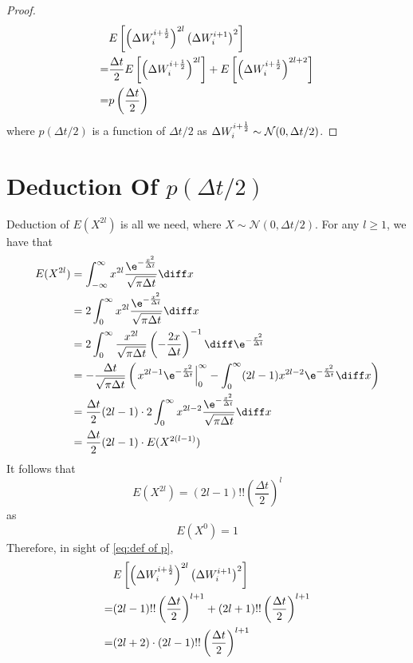 \begin{proof}
        \begin{equation}
            \label{eq:def of p}
            \begin{aligned}
            &E\left[
            \left(\Delta W_{i}^{i+\frac{1}{2}}\right)^{2l}
            \left(\Delta W_{i}^{i+1}\right)^2
            \right]\\
            =&\frac{\Delta t}{2}E\left[\left(\Delta W_{i}^{i+\frac{1}{2}}\right)^{2l}\right]
            +E\left[\left(\Delta W_{i}^{i+\frac{1}{2}}\right)^{2l+2}\right]\\
            =&p\left(\frac{\Delta t}{2}\right)
            \end{aligned}
        \end{equation}
        where $p(\Delta t/2)$ is a function of $\Delta t/2$
        as $\Delta W_{i}^{i+\frac{1}{2}}\sim\mathcal N(0,\Delta t/2)$.
    \end{proof}

    \section[Deduction Of p(Delta t/2)]{Deduction Of $p(\Delta t/2)$}
    \label{sec:deduction of p}
    Deduction of $E(X^{2l})$ is all we need, where $X\sim\mathcal N(0,\Delta t/2)$.
    For any $l\geq 1$, we have that
    \[\begin{aligned}
        E(X^{2l})&=\int_{-\infty}^\infty
        x^{2l}\frac{\e^{-\frac{x^2}{\Delta t}}}{\sqrt{\pi\Delta t}}
        \diff x\\
        &=2\int_{0}^\infty
        x^{2l}\frac{\e^{-\frac{x^2}{\Delta t}}}{\sqrt{\pi\Delta t}}
        \diff x\\
        &=2\int_{0}^\infty
        \frac{x^{2l}}{\sqrt{\pi\Delta t}}
        \left(-\frac{2x}{\Delta t}\right)^{-1}
        \diff \e^{-\frac{x^2}{\Delta t}}\\
        &=-\frac{\Delta t}{\sqrt{\pi\Delta t}}
        \left(\left.x^{2l-1}\e^{-\frac{x^2}{\Delta t}}\right|^\infty_0
        -\int_0^\infty(2l-1)x^{2l-2}\e^{-\frac{x^2}{\Delta t}}\diff x
        \right)\\
        &=\frac{\Delta t}{2}(2l-1)\cdot
        2\int_0^\infty x^{2l-2}\frac{\e^{-\frac{x^2}{\Delta t}}}{\sqrt{\pi\Delta t}}\diff x\\
        &=\frac{\Delta t}{2}(2l-1)\cdot E(X^{2(l-1)})
    \end{aligned}\]
    It follows that
    \[E(X^{2l})=(2l-1)!!\left(\frac{\Delta t}{2}\right)^l\]
    as
    \[E(X^0)=1\]
    Therefore, in sight of \cref{eq:def of p},
    \[\begin{aligned}
        &E\left[\left(\Delta W_{i}^{i+\frac{1}{2}}\right)^{2l}
        \left(\Delta W_{i}^{i+1}\right)^2\right]\\
        =&(2l-1)!!\left(\frac{\Delta t}{2}\right)^{l+1}
        +(2l+1)!!\left(\frac{\Delta t}{2}\right)^{l+1}\\
        =&(2l+2)\cdot(2l-1)!!\left(\frac{\Delta t}{2}\right)^{l+1}
    \end{aligned}\]